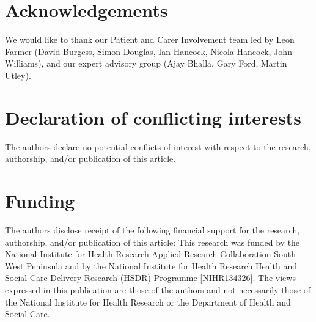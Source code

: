\section{Acknowledgements}

We would like to thank our Patient and Carer Involvement team led by Leon Farmer (David Burgess, Simon Douglas, Ian Hancock, Nicola Hancock, John Williams), and our expert advisory group (Ajay Bhalla, Gary Ford, Martin Utley).

\section{Declaration of conflicting interests}

The authors declare no potential conflicts of interest with respect to the research, authorship, and/or publication of this article. 

\section{Funding}

The authors disclose receipt of the following financial support for the research, authorship, and/or publication of this article: This research was funded by the National Institute for Health Research Applied Research Collaboration South West Peninsula and by the National Institute for Health Research Health and Social Care Delivery Research (HSDR) Programme [NIHR134326]. The views expressed in this publication are those of the authors and not necessarily those of the National Institute for Health Research or the Department of Health and Social Care. 